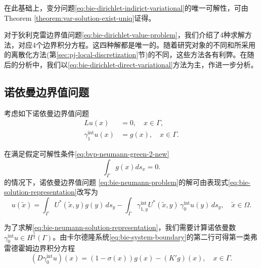 在此基础上，变分问题\eqref{eq:bie-dirichlet-indirict-variational}的唯一可解性，可由Theorem \ref{theorem:var-solution-exist-uniq}证得。

\begin{remark}
  对于狄利克雷边界值问题\eqref{eq:bie-dirichlet-value-problem}，我们介绍了4种求解方法，对应4个边界积分方程。这四种解都是唯一的。随着研究对象的不同和所采用的离散化方法(第\ref{sec:pj-local-discretization}节)的不同，这些方法各有利弊。在随后的分析中，我们以\eqref{eq:bie-dirichlet-direct-variational}方法为主，作进一步分析。
\end{remark}


\subsection{诺依曼边界值问题}
\label{sec:bie-neumann}
考虑如下诺依曼边界值问题
\begin{equation}
  \label{eq:bie-neumann-problem}
  \begin{split}
    L u (x) & = 0, \quad x \in \Gamma, \\
    \gamma_{1}^{\text{int}} u(x) & = g(x), \quad x \in \Gamma.
  \end{split}
\end{equation}

在满足假定可解性条件\eqref{eq:bvp-neumann-green-2-new}
\begin{equation}
  \label{eq:bie-neumann-solvability-cond}
  \int_{\Gamma} g(x) d s_{x} = 0.
\end{equation}
的情况下，诺依曼边界值问题  \eqref{eq:bie-neumann-problem}的解可由表现式\eqref{eq:bie-solution-representation}改写为
\begin{equation}
  \label{eq:bie-neumann-solution-representation}
  u(\widetilde{x})
  = \int_{\Gamma} U^{*}(\widetilde{x}, y) g(y) \, d s_{y}
  - \int_{\Gamma} \gamma_{1,y}^{\text{int}} U^{*}(\widetilde{x}, y) \, \gamma_{0}^{\text{int}} u(y) \, d s_{y}, \quad \widetilde{x} \in \Omega.
\end{equation}

为了求解\eqref{eq:bie-neumann-solution-representation}，我们需要计算诺依曼数$\gamma_{0}^{\text{int}} u \in H^{\frac{1}{2}}(\Gamma)$。由卡尔德隆系统\eqref{eq:bie-system-boundary}的第二行可得第一类弗雷德霍姆边界积分方程
\begin{equation}
  \label{eq:bie-neumann-calderon-second}
  \left( D \gamma_{0}^{\text{int}} u \right)(x)
  = \left( 1 - \sigma(x) \right) g(x) -
  \left( K' g \right)(x), \quad x \in \Gamma.
\end{equation}


